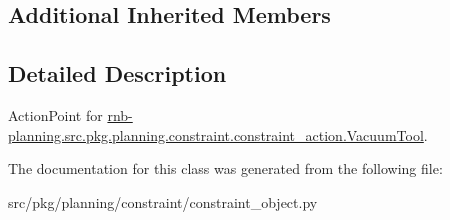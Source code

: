 \subsection*{Additional Inherited Members}


\subsection{Detailed Description}
Action\+Point for \hyperlink{classrnb-planning_1_1src_1_1pkg_1_1planning_1_1constraint_1_1constraint__action_1_1_vacuum_tool}{rnb-\/planning.\+src.\+pkg.\+planning.\+constraint.\+constraint\+\_\+action.\+Vacuum\+Tool}. 

The documentation for this class was generated from the following file\+:\begin{DoxyCompactItemize}
\item 
src/pkg/planning/constraint/constraint\+\_\+object.\+py\end{DoxyCompactItemize}
